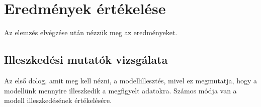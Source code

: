 \documentclass[
  letterpaper,
]{krantz}
\begin{document}
\hypertarget{eredmuxe9nyek-uxe9rtuxe9keluxe9se}{%
\section{Eredmények
értékelése}\label{eredmuxe9nyek-uxe9rtuxe9keluxe9se}}

Az elemzés elvégzése után nézzük meg az eredményeket.

\hypertarget{illeszkeduxe9si-mutatuxf3k-vizsguxe1lata}{%
\subsection{Illeszkedési mutatók
vizsgálata}\label{illeszkeduxe9si-mutatuxf3k-vizsguxe1lata}}

Az első dolog, amit meg kell nézni, a modellillesztés, mivel ez
megmutatja, hogy a modellünk mennyire illeszkedik a megfigyelt adatokra.
Számos módja van a modell illeszkedésének értékelésére.
\end{document}
